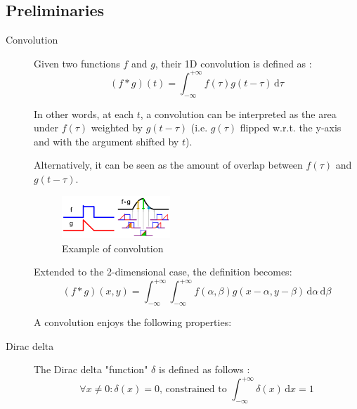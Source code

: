 \subsection{Preliminaries}

\begin{description}
    \item[Convolution] 
        Given two functions $f$ and $g$, their 1D convolution is defined as \cite{wiki:1d_convolution}:
        \[ (f * g)(t) = \int_{-\infty}^{+\infty} f(\tau)g(t - \tau) \,\text{d}\tau  \]

        In other words, at each $t$, a convolution can be interpreted as the area under $f(\tau)$ 
        weighted by $g(t - \tau)$ (i.e. $g(\tau)$ flipped w.r.t. the y-axis and with the argument shifted by $t$).

        Alternatively, it can be seen as the amount of overlap between $f(\tau)$ and $g(t - \tau)$.

        \begin{figure}[H]
            \centering
            \includegraphics[width=0.4\textwidth]{./img/continuous_convolution_example.png}
            \caption{Example of convolution}
        \end{figure}

        Extended to the 2-dimensional case, the definition becomes:
        \[ (f * g)(x, y) = \int_{-\infty}^{+\infty} \int_{-\infty}^{+\infty} f(\alpha, \beta)g(x-\alpha, y-\beta) \,\text{d}\alpha\,\text{d}\beta  \]
        
        A convolution enjoys the following properties: 

    \item[Dirac delta] 
        The Dirac delta "function" $\delta$ is defined as follows \cite{wiki:dirac,book:sonka}:
        \[ \forall x \neq 0: \delta(x) = 0 \text{, constrained to } \int_{-\infty}^{+\infty} \delta(x) \,\text{d}x = 1 \]


\end{description}
